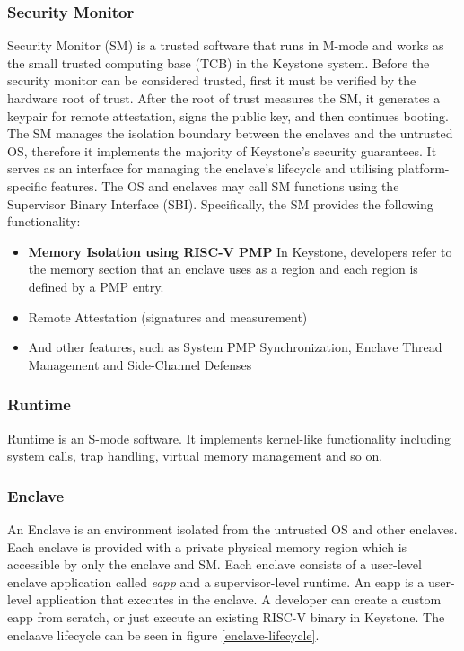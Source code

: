 \subsubsection{Security Monitor}
Security Monitor (SM) is a trusted software that runs in M-mode and works as the small trusted computing base (TCB) in the Keystone system. Before the security monitor can be considered trusted, first it must be verified by the hardware root of trust. After the root of trust measures the SM, it generates a keypair for remote attestation, signs the public key, and then continues booting. The SM manages the isolation boundary between the enclaves and the untrusted OS, therefore it implements the majority of Keystone's security guarantees.  It serves as an interface for managing the enclave's lifecycle and utilising platform-specific features. The OS and enclaves may call SM functions using the Supervisor Binary Interface (SBI). Specifically, the SM provides the following functionality:
\begin{itemize}
    \item \textbf{Memory Isolation using RISC-V PMP}
        In Keystone, developers refer to the memory section that an enclave uses as a region and each region is defined by a PMP entry.

    \item Remote Attestation (signatures and measurement)
    \item And other features, such as System PMP Synchronization, Enclave Thread Management and Side-Channel Defenses  
\end{itemize}

\subsubsection{Runtime}
Runtime is an S-mode software. It implements kernel-like functionality including system calls, trap handling, virtual memory management and so on.
\subsubsection{Enclave}
An Enclave is an environment isolated from the untrusted OS and other enclaves. Each enclave is provided with a private physical memory region which is accessible by only the enclave and SM. Each enclave consists of a user-level enclave application called \textit{eapp} and a supervisor-level runtime. An eapp is a user-level application that executes in the enclave. A developer can create a custom eapp from scratch, or just execute an existing RISC-V binary in Keystone. The enclaave lifecycle can be seen in figure \ref{enclave-lifecycle}. 

